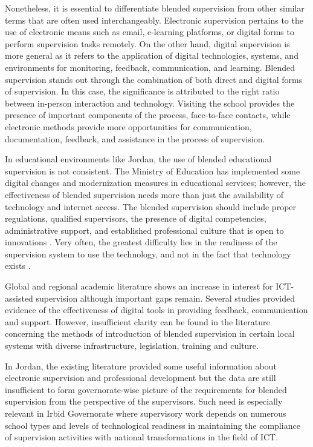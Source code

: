 \documentclass[10pt]{NSP1}
\begin{document}
Nonetheless, it is essential to differentiate blended supervision from other similar terms that are often used interchangeably. Electronic supervision pertains to the use of electronic means such as email, e-learning platforms, or digital forms to perform supervision tasks remotely. On the other hand, digital supervision is more general as it refers to the application of digital technologies, systems, and environments for monitoring, feedback, communication, and learning. Blended supervision stands out through the combination of both direct and digital forms of supervision. In this case, the significance is attributed to the right ratio between in-person interaction and technology. Visiting the school provides the presence of important components of the process, face-to-face contacts, while electronic methods provide more opportunities for communication, documentation, feedback, and assistance in the process of supervision.

In educational environments like Jordan, the use of blended educational supervision is not consistent. The Ministry of Education has implemented some digital changes and modernization measures in educational services; however, the effectiveness of blended supervision needs more than just the availability of technology and internet access. The blended supervision should include proper regulations, qualified supervisors, the presence of digital competencies, administrative support, and established professional culture that is open to innovations \cite{ref10,ref11,ref12}. Very often, the greatest difficulty lies in the readiness of the supervision system to use the technology, and not in the fact that technology exists \cite{ref13}.

Global and regional academic literature shows an increase in interest for ICT-assisted supervision although important gaps remain. Several studies provided evidence of the effectiveness of digital tools in providing feedback, communication and support. However, insufficient clarity can be found in the literature concerning the methods of introduction of blended supervision in certain local systems with diverse infrastructure, legislation, training and culture.

In Jordan, the existing literature provided some useful information about electronic supervision and professional development but the data are still insufficient to form governorate-wise picture of the requirements for blended supervision from the perspective of the supervisors. Such need is especially relevant in Irbid Governorate where supervisory work depends on numerous school types and levels of technological readiness in maintaining the compliance of supervision activities with national transformations in the field of ICT.
\end{document}
